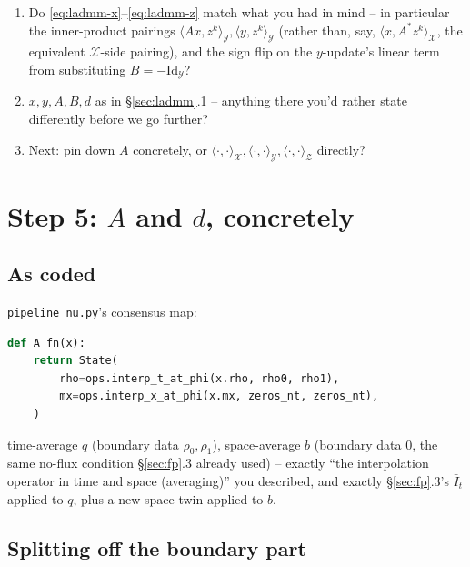 \documentclass[11pt]{article}
\newcommand{\code}[1]{\texttt{#1}}
\begin{document}
\begin{enumerate}
  \item Do \eqref{eq:ladmm-x}--\eqref{eq:ladmm-z} match what you had in mind -- in
        particular the inner-product pairings $\langle Ax,z^k\rangle_\mathcal{Y},
        \langle y,z^k\rangle_\mathcal{Y}$ (rather than, say, $\langle x,A^*z^k\rangle_
        \mathcal{X}$, the equivalent $\mathcal X$-side pairing), and the sign flip on the
        $y$-update's linear term from substituting $B=-\mathrm{Id}_\mathcal{Y}$?
  \item $x,y,A,B,d$ as in \S\ref{sec:ladmm}.1 -- anything there you'd rather state
        differently before we go further?
  \item Next: pin down $A$ concretely, or
        $\langle\cdot,\cdot\rangle_\mathcal{X},\langle\cdot,\cdot\rangle_\mathcal{Y},
        \langle\cdot,\cdot\rangle_\mathcal{Z}$ directly?
\end{enumerate}

\section{Step 5: $A$ and $d$, concretely}
\label{sec:A-d}

\subsection{As coded}

\code{pipeline\_nu.py}'s consensus map:
\begin{lstlisting}[language=Python]
def A_fn(x):
    return State(
        rho=ops.interp_t_at_phi(x.rho, rho0, rho1),
        mx=ops.interp_x_at_phi(x.mx, zeros_nt, zeros_nt),
    )
\end{lstlisting}
time-average $q$ (boundary data $\rho_0,\rho_1$), space-average $b$ (boundary data $0$,
the same no-flux condition \S\ref{sec:fp}.3 already used) -- exactly ``the interpolation
operator in time and space (averaging)'' you described, and exactly \S\ref{sec:fp}.3's
$\bar I_t$ applied to $q$, plus a new space twin applied to $b$.

\subsection{Splitting off the boundary part}
\end{document}
